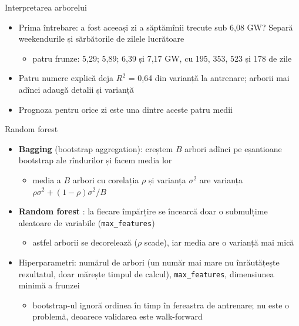 \begin{frame}{Interpretarea arborelui}
\itemsize{\small}
\begin{itemize}
    \item Prima întrebare: a fost aceeași zi a săptămînii trecute sub 6{,}08 GW? Separă weekendurile și sărbătorile de zilele lucrătoare
    \begin{itemize}
        \item patru frunze: 5{,}29; 5{,}89; 6{,}39 și 7{,}17 GW, cu 195, 353, 523 și 178 de zile
    \end{itemize}
    \item Patru numere explică deja $R^2$ = 0{,}64 din varianță la antrenare; arborii mai adînci adaugă detalii și varianță
    \item Prognoza pentru orice zi este una dintre aceste patru medii
\end{itemize}
\end{frame}

\begin{frame}{Random forest}
\itemsize{\small}
\begin{itemize}
    \item \textbf{Bagging} (bootstrap aggregation): creștem $B$ arbori adînci pe eșantioane bootstrap ale rîndurilor și facem media lor
    \begin{itemize}
        \item media a $B$ arbori cu corelația $\rho$ și varianța $\sigma^2$ are varianța $\rho\sigma^2 + (1 - \rho)\sigma^2/B$
    \end{itemize}
    \item \textbf{Random forest} : la fiecare împărțire se încearcă doar o submulțime aleatoare de variabile (\texttt{max\_features})
    \begin{itemize}
        \item astfel arborii se decorelează ($\rho$ scade), iar media are o varianță mai mică
    \end{itemize}
    \item Hiperparametri: numărul de arbori (un număr mai mare nu înrăutățește rezultatul, doar mărește timpul de calcul), \texttt{max\_features}, dimensiunea minimă a frunzei
    \begin{itemize}
        \item bootstrap-ul ignoră ordinea în timp în fereastra de antrenare; nu este o problemă, deoarece validarea este walk-forward
    \end{itemize}
\end{itemize}
\end{frame}

